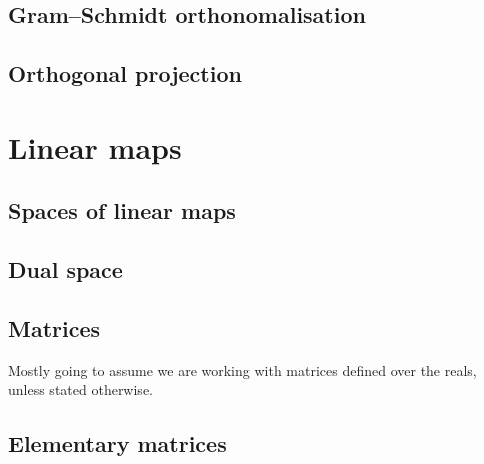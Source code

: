 \documentclass[letter-paper]{tufte-book}
\begin{document}

\section{Gram--Schmidt orthonomalisation}


\section{Orthogonal projection}


\chapter{Linear maps}


\section{Spaces of linear maps}


\section{Dual space}


\section{Matrices}

Mostly going to assume we are working with matrices defined over the reals,
unless stated otherwise.


\section{Elementary matrices}
\end{document}
